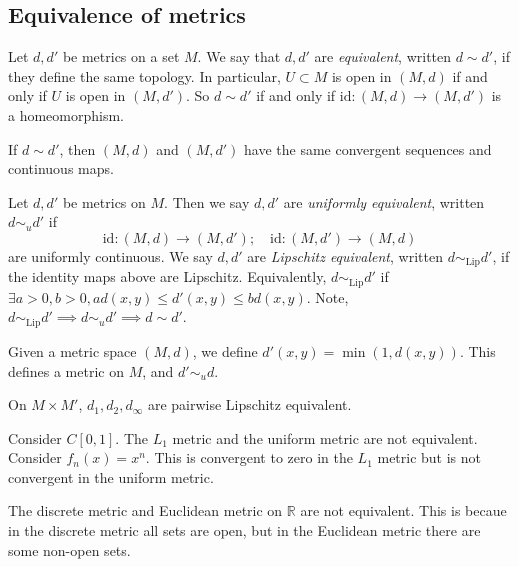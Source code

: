 \subsection{Equivalence of metrics}
\begin{definition}
	Let \( d, d' \) be metrics on a set \( M \).
	We say that \( d, d' \) are \textit{equivalent}, written \( d \sim d' \), if they define the same topology.
	In particular, \( U \subset M \) is open in \( (M,d) \) if and only if \( U \) is open in \( (M,d') \).
	So \( d \sim d' \) if and only if \( \mathrm{id} \colon (M,d) \to (M,d') \) is a homeomorphism.
\end{definition}
\begin{remark}
	If \( d \sim d' \), then \( (M,d) \) and \( (M, d') \) have the same convergent sequences and continuous maps.
\end{remark}
\begin{definition}
	Let \( d, d' \) be metrics on \( M \).
	Then we say \( d, d' \) are \textit{uniformly equivalent}, written \( d \sim_u d' \) if
	\[
		\mathrm{id} \colon (M, d) \to (M, d');\quad \mathrm{id} \colon (M, d') \to (M, d)
	\]
	are uniformly continuous.
	We say \( d, d' \) are \textit{Lipschitz equivalent}, written \( d \sim_\mathrm{Lip} d' \), if the identity maps above are Lipschitz.
	Equivalently, \( d \sim_\mathrm{Lip} d' \) if \( \exists a > 0, b > 0, ad(x,y) \leq d'(x,y) \leq bd(x,y) \).
	Note, \( d \sim_\mathrm{Lip} d' \implies d \sim_u d' \implies d \sim d' \).
\end{definition}
\begin{example}
	Given a metric space \( (M,d) \), we define \( d'(x,y) = \min(1,d(x,y)) \).
	This defines a metric on \( M \), and \( d' \sim_u d \).
\end{example}
\begin{example}
	On \( M \times M' \), \( d_1, d_2, d_\infty \) are pairwise Lipschitz equivalent.
\end{example}
\begin{example}
	Consider \( C[0,1] \).
	The \( L_1 \) metric and the uniform metric are not equivalent.
	Consider \( f_n(x) = x^n \).
	This is convergent to zero in the \( L_1 \) metric but is not convergent in the uniform metric.
\end{example}
\begin{example}
	The discrete metric and Euclidean metric on \( \mathbb R \) are not equivalent.
	This is becaue in the discrete metric all sets are open, but in the Euclidean metric there are some non-open sets.
\end{example}
